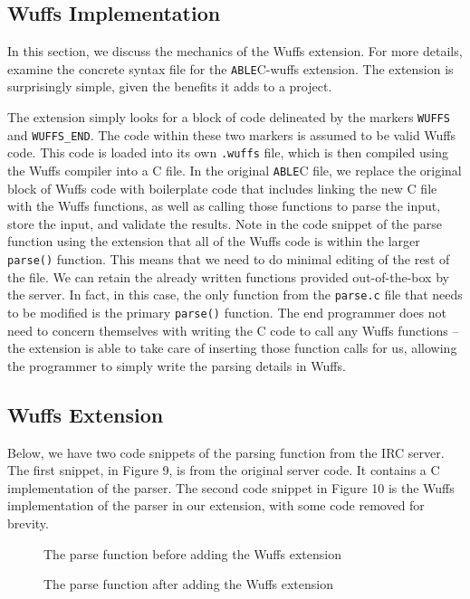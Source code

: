 \documentclass[main.tex]{subfiles}
\begin{document}
\subsection{Wuffs Implementation}
In this section, we discuss the mechanics of the Wuffs extension. For more details, examine the concrete syntax file
for the \verb|ABLE|C-wuffs extension. The extension is surprisingly simple, given the benefits it adds to a project.

The extension simply looks for a block of code delineated by the markers \verb|WUFFS| and \verb|WUFFS_END|. The
code within these two markers is assumed to be valid Wuffs code. This code is loaded into its own \verb|.wuffs| file,
which is then compiled using the Wuffs compiler into a C file. In the original \verb|ABLE|C file, we replace the original
block of Wuffs code with boilerplate code that includes linking the new C file with the Wuffs functions, as well as calling
those functions to parse the input, store the input, and validate the results. Note in the code snippet of the parse 
function using the extension that all of the Wuffs code is within the larger \verb|parse()| function. This means that we
need to do minimal editing of the rest of the file. We can retain the already written functions provided out-of-the-box by
the server. In fact, in this case, the only function from the \verb|parse.c| file that needs to be modified is the primary
\verb|parse()| function. The end programmer does not need to concern themselves with writing the C code to call any
Wuffs functions -- the extension is able to take care of inserting those function calls for us, allowing the programmer to
simply write the parsing details in Wuffs.

\subsection{Wuffs Extension}
Below, we have two code snippets of the parsing function from the IRC server. The first snippet, in Figure 9, is from the original 
server code. It contains a C implementation of the parser. The second code snippet in Figure 10 is the Wuffs implementation 
of the parser in our extension, with some code removed for brevity. 
\begin{figure}[hp]
	
	\caption{The parse function before adding the Wuffs extension}
\end{figure}
\begin{figure}[hp]
	
	\caption{The parse function after adding the Wuffs extension}
\end{figure}
\end{document}
